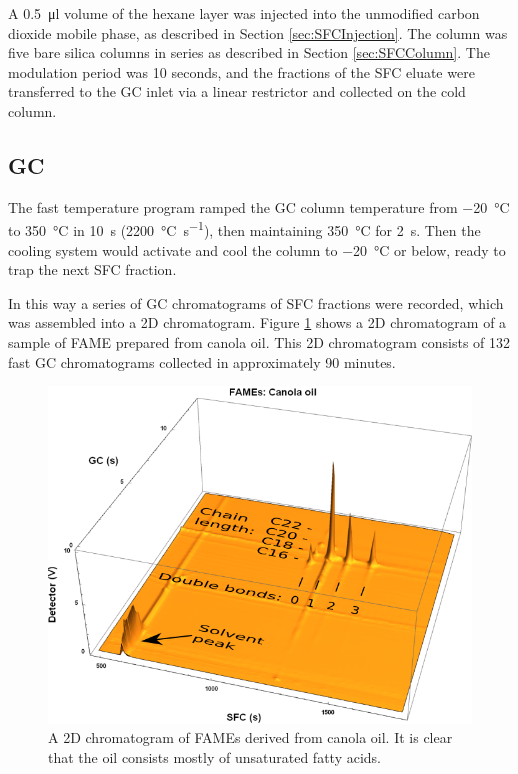 A \SI{0.5}{\micro\litre} volume of the hexane layer was injected into the
unmodified carbon dioxide mobile phase, as described in Section
\ref{sec:SFCInjection}. The column was five bare silica columns in series as
described in Section \ref{sec:SFCColumn}. The modulation period was 10 seconds,
and the fractions of the SFC eluate were transferred to the GC inlet via a
linear restrictor and collected on the cold column.

\subsection{GC}

The fast temperature program ramped the GC column temperature from
\SI{-20}{\celsius} to \SI{350}{\celsius} in \SI{10}{s}
(\SI{2200}{\celsius\per\second}), then maintaining \SI{350}{\celsius} for
\SI{2}{\second}. Then the cooling system would activate and cool the column to
\SI{-20}{\celsius} or below, ready to trap the next SFC fraction.

In this way a series of GC chromatograms of SFC fractions were recorded, which
was assembled into a 2D chromatogram. Figure \ref{fig:2DCanola} shows
a 2D chromatogram of a sample of FAME prepared from canola oil. This 2D
chromatogram consists of 132 fast GC chromatograms collected in approximately 90
minutes.


\begin{figure}
\centering
\includegraphics[width=\textwidth]{Figures/Interpretation.png}
\decoRule

\caption[SFC×GC of canola oil]{A 2D chromatogram of FAMEs derived from
canola oil. It is clear that the oil consists mostly of unsaturated fatty
acids.}

\label{fig:2DCanola}
\end{figure}

